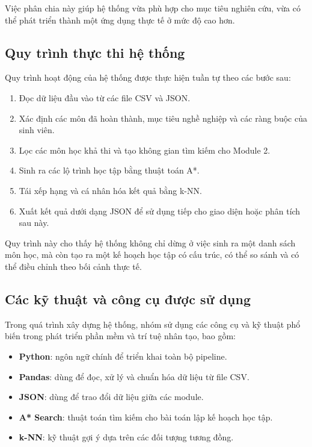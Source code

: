 Việc phân chia này giúp hệ thống vừa phù hợp cho mục tiêu nghiên cứu, vừa có thể phát triển thành một ứng dụng thực tế ở mức độ cao hơn.

\subsection{Quy trình thực thi hệ thống}

Quy trình hoạt động của hệ thống được thực hiện tuần tự theo các bước sau:
\begin{enumerate}
    \item Đọc dữ liệu đầu vào từ các file CSV và JSON.
    \item Xác định các môn đã hoàn thành, mục tiêu nghề nghiệp và các ràng buộc của sinh viên.
    \item Lọc các môn học khả thi và tạo không gian tìm kiếm cho Module 2.
    \item Sinh ra các lộ trình học tập bằng thuật toán A*.
    \item Tái xếp hạng và cá nhân hóa kết quả bằng k-NN.
    \item Xuất kết quả dưới dạng JSON để sử dụng tiếp cho giao diện hoặc phân tích sau này.
\end{enumerate}

Quy trình này cho thấy hệ thống không chỉ dừng ở việc sinh ra một danh sách môn học, mà còn tạo ra một kế hoạch học tập có cấu trúc, có thể so sánh và có thể điều chỉnh theo bối cảnh thực tế.

\subsection{Các kỹ thuật và công cụ được sử dụng}

Trong quá trình xây dựng hệ thống, nhóm sử dụng các công cụ và kỹ thuật phổ biến trong phát triển phần mềm và trí tuệ nhân tạo, bao gồm:
\begin{itemize}
    \item \textbf{Python}: ngôn ngữ chính để triển khai toàn bộ pipeline.
    \item \textbf{Pandas}: dùng để đọc, xử lý và chuẩn hóa dữ liệu từ file CSV.
    \item \textbf{JSON}: dùng để trao đổi dữ liệu giữa các module.
    \item \textbf{A* Search}: thuật toán tìm kiếm cho bài toán lập kế hoạch học tập.
    \item \textbf{k-NN}: kỹ thuật gợi ý dựa trên các đối tượng tương đồng.
\end{itemize}

